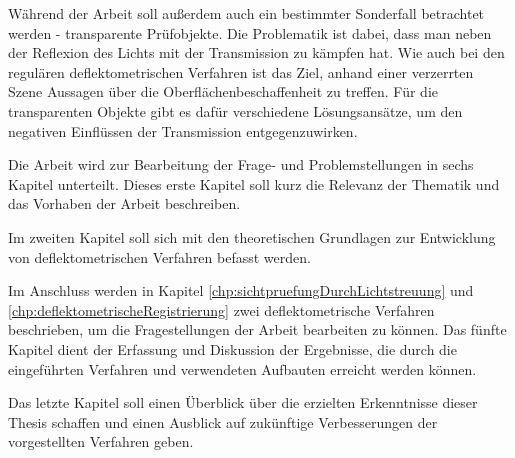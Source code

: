 \p
Während der Arbeit soll außerdem auch ein bestimmter Sonderfall betrachtet werden - transparente Prüfobjekte.
Die Problematik ist dabei, dass man neben der Reflexion des Lichts mit der Transmission zu kämpfen hat.
Wie auch bei den regulären deflektometrischen Verfahren ist das Ziel, anhand einer verzerrten Szene Aussagen über die Oberflächenbeschaffenheit zu treffen.
Für die transparenten Objekte gibt es dafür verschiedene Lösungsansätze, um den negativen Einflüssen der Transmission entgegenzuwirken.

\p
Die Arbeit wird zur Bearbeitung der Frage- und Problemstellungen in sechs Kapitel unterteilt. 
Dieses erste Kapitel soll kurz die Relevanz der Thematik und das Vorhaben der Arbeit beschreiben.

\p
Im zweiten Kapitel soll sich mit den theoretischen Grundlagen zur Entwicklung von deflektometrischen Verfahren befasst werden.

\p
Im Anschluss werden in Kapitel \ref{chp:sichtpruefungDurchLichtstreuung} und \ref{chp:deflektometrischeRegistrierung} zwei deflektometrische Verfahren beschrieben, um die Fragestellungen der Arbeit bearbeiten zu können.
\p
Das fünfte Kapitel dient der Erfassung und Diskussion der Ergebnisse, die durch die eingeführten Verfahren und verwendeten Aufbauten erreicht werden können.

\p
Das letzte Kapitel soll einen Überblick über die erzielten Erkenntnisse dieser Thesis schaffen und einen Ausblick auf zukünftige Verbesserungen der vorgestellten Verfahren geben.